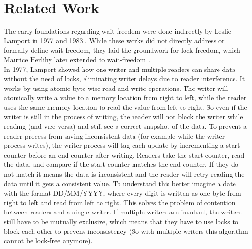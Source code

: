 \chapter{Related Work}\label{ch:related-work}

The early foundations regarding wait-freedom were done indirectly by Leslie Lamport in 1977 and 1983 \cite{Lamport1977ConcurrentReading,Lamport1983SPSCCircularBuffer}. While these works did not directly address or formally define wait-freedom, they laid the groundwork for lock-freedom, which Maurice Herlihy later extended to wait-freedom \cite{herlihy1991wait}. \\
In 1977, Lamport showed how one writer and multiple readers can share data without the need of locks, eliminating writer delays due to reader interference. It works by using atomic byte-wise read and write operations. The writer will atomically write a value to a memory location from right to left, while the reader uses the same memory location to read the value from left to right. So even if the writer is still in the process of writing, the reader will not block the writer while reading (and vice versa) and still see a correct snapshot of the data. To prevent a reader process from saving inconsistent data (for example while the writer process writes), the writer process will tag each update by incrementing a start counter before an end counter after writing. Readers take the start counter, read the data, and compare if the start counter matches the end counter. If they do not match it means the data is inconsistent and the reader will retry reading the data until it gets a consistent value. To understand this better imagine a date with the format DD/MM/YYYY, where every digit is written as one byte from right to left and read from left to right. This solves the problem of contention between readers and a single writer. If multiple writers are involved, the writers still have to be mutually exclusive, which means that they have to use locks to block each other to prevent inconsistency (So with multiple writers this algorithm cannot be lock-free anymore). \cite{Lamport1977ConcurrentReading} 

